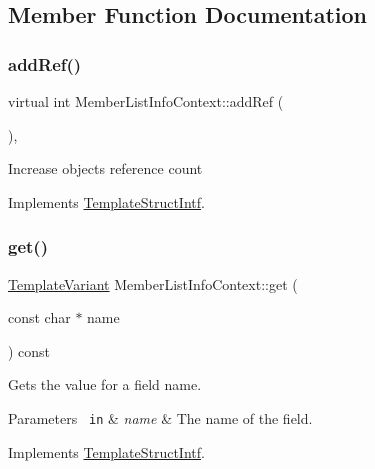 \subsection{Member Function Documentation}
\mbox{\label{class_member_list_info_context_a8c6f32abaf9278db133168c67a821215}} 
\subsubsection{\texorpdfstring{addRef()}{addRef()}}
{\footnotesize\ttfamily virtual int Member\+List\+Info\+Context\+::add\+Ref (\begin{DoxyParamCaption}{ }\end{DoxyParamCaption})\hspace{0.3cm}{\ttfamily [inline]}, {\ttfamily [virtual]}}

Increase object\textquotesingle{}s reference count 

Implements \mbox{\hyperlink{class_template_struct_intf_a05fe97ad47633beb326f69686faed581}{Template\+Struct\+Intf}}.

\mbox{\label{class_member_list_info_context_af2f73ee537f6709ca2549c9d8f9444fa}} 
\subsubsection{\texorpdfstring{get()}{get()}}
{\footnotesize\ttfamily \mbox{\hyperlink{class_template_variant}{Template\+Variant}} Member\+List\+Info\+Context\+::get (\begin{DoxyParamCaption}\item[{const char $\ast$}]{name }\end{DoxyParamCaption}) const\hspace{0.3cm}{\ttfamily [virtual]}}

Gets the value for a field name. 
\begin{DoxyParams}[1]{Parameters}
\mbox{\texttt{ in}}  & {\em name} & The name of the field. \\
\hline
\end{DoxyParams}


Implements \mbox{\hyperlink{class_template_struct_intf_a3d610cb81b4adbb531ebed3aa3d09b51}{Template\+Struct\+Intf}}.

